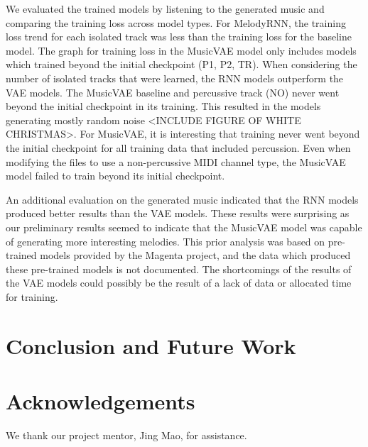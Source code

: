 \documentclass{article}
\begin{document}
We evaluated the trained models by listening to the generated music and comparing the training loss across model types. For MelodyRNN, the training loss trend for each isolated track was less than the training loss for the baseline model. The graph for training loss in the MusicVAE model only includes models which trained beyond the initial checkpoint (P1, P2, TR). When considering the number of isolated tracks that were learned, the RNN models outperform the VAE models. The MusicVAE baseline and percussive track (NO) never went beyond the initial checkpoint in its training. This resulted in the models generating mostly random noise <INCLUDE FIGURE OF WHITE CHRISTMAS>. For MusicVAE, it is interesting that training never went beyond the initial checkpoint for all training data that included percussion. Even when modifying the files to use a non-percussive MIDI channel type, the MusicVAE model failed to train beyond its initial checkpoint.


An additional evaluation on the generated music indicated that the RNN models produced better results than the VAE models. These results were surprising as our preliminary results seemed to indicate that the MusicVAE model was capable of generating more interesting melodies. This prior analysis was based on pre-trained models provided by the Magenta project, and the data which produced these pre-trained models is not documented. The shortcomings of the results of the VAE models could possibly be the result of a lack of data or allocated time for training.



\section{Conclusion and Future Work}



\section{Acknowledgements}
We thank our project mentor, Jing Mao, for assistance.\\
\end{document}
